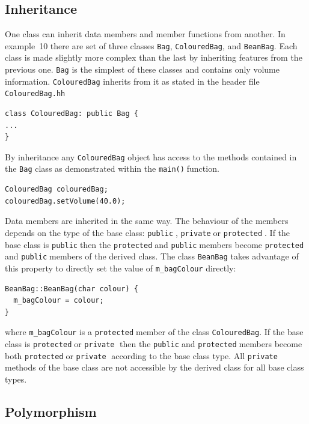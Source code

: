 \documentclass[11pt,a4paper]{scrartcl}
\def\main{\texttt{main()}$\;$}
\def\public{\texttt{public}$\;$}
\def\private{\texttt{private}$\;$}
\def\protected{\texttt{protected}$\;$}
\begin{document}

\subsection{Inheritance}
One class can inherit data members and member functions from another.
In example~10 there are set of
three classes \texttt{Bag}, \texttt{ColouredBag}, and
\texttt{BeanBag}.  Each class is made slightly more complex than the last
by inheriting features from the previous one.  \texttt{Bag} is the
simplest of these classes and contains only volume information.
\texttt{ColouredBag} inherits from it as stated in the header
file \texttt{ColouredBag.hh}
\begin{verbatim}
class ColouredBag: public Bag {
...
}
\end{verbatim}
By inheritance any \texttt{ColouredBag} object has access to the
methods contained in the \texttt{Bag} class as demonstrated within the
\main function.
%
\begin{verbatim}
ColouredBag colouredBag;
colouredBag.setVolume(40.0);
\end{verbatim}
%
Data members are inherited in the same way.  The behaviour of the
members depends on the type of the base class: \public, \private or
\protected.  If the base class is \public then the \protected and
\public members become \protected and \public members of the derived
class.  The class \texttt{BeanBag} takes advantage of this property to
directly set the value of \texttt{m\_bagColour} directly:
\begin{verbatim}
BeanBag::BeanBag(char colour) {
  m_bagColour = colour;
}
\end{verbatim}
where \texttt{m\_bagColour} is a \protected member of the class
\texttt{ColouredBag}.  If the base class is \protected or \private
then the \public and \protected members become both \protected or \private
according to the base class type.  All \private methods of the base
class are not accessible by the derived class for all base class types.


\subsection{Polymorphism}
\end{document}
